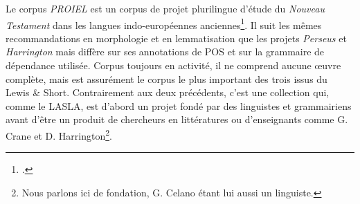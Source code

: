 Le corpus \textit{PROIEL} est un corpus de projet plurilingue d'étude du \textit{Nouveau Testament} dans les langues indo-européennes anciennes\footcite{haug_creating_2008}. Il suit les mêmes recommandations en morphologie et en lemmatisation que les projets \textit{Perseus} et \textit{Harrington} mais diffère sur ses annotations de POS et sur la grammaire de dépendance utilisée. Corpus toujours en activité, il ne comprend aucune œuvre complète, mais est assurément le corpus le plus important des trois issus du Lewis \& Short. Contrairement aux deux précédents, c'est une collection qui, comme le LASLA, est d'abord un projet fondé par des linguistes et grammairiens avant d'être un produit de chercheurs en littératures ou d'enseignants comme G. Crane et D. Harrington\footnote{Nous parlons ici de fondation, G. Celano étant lui aussi un linguiste.}.

\begin{table}[h]
\centering
{}
\caption{Résumé des informations sur les quatre corpus disponibles. Il existe 137 œuvres au sens du LASLA, mais certaines sont des des découpes inhabituelles, nous préférons donc la notation 100+ ici.}
\label{tab:lemmatisation:corpus-entrainement}
\end{table}

